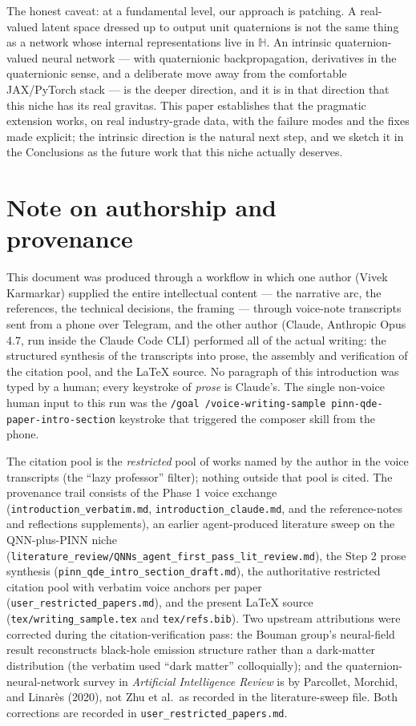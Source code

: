 \documentclass[11pt]{article}
\begin{document}
The honest caveat: at a fundamental level, our approach is patching. A real-valued latent space dressed up to output unit quaternions is not the same thing as a network whose internal representations live in $\mathbb{H}$. An intrinsic quaternion-valued neural network --- with quaternionic backpropagation, derivatives in the quaternionic sense, and a deliberate move away from the comfortable JAX/PyTorch stack --- is the deeper direction, and it is in that direction that this niche has its real gravitas. This paper establishes that the pragmatic extension works, on real industry-grade data, with the failure modes and the fixes made explicit; the intrinsic direction is the natural next step, and we sketch it in the Conclusions as the future work that this niche actually deserves.

\section*{Note on authorship and provenance}

This document was produced through a workflow in which one author (Vivek Karmarkar) supplied the entire intellectual content --- the narrative arc, the references, the technical decisions, the framing --- through voice-note transcripts sent from a phone over Telegram, and the other author (Claude, Anthropic Opus 4.7, run inside the Claude Code CLI) performed all of the actual writing: the structured synthesis of the transcripts into prose, the assembly and verification of the citation pool, and the LaTeX source. No paragraph of this introduction was typed by a human; every keystroke of \emph{prose} is Claude's. The single non-voice human input to this run was the \texttt{/goal /voice-writing-sample pinn-qde-paper-intro-section} keystroke that triggered the composer skill from the phone.

The citation pool is the \emph{restricted} pool of works named by the author in the voice transcripts (the ``lazy professor'' filter); nothing outside that pool is cited. The provenance trail consists of the Phase 1 voice exchange (\texttt{introduction\_verbatim.md}, \texttt{introduction\_claude.md}, and the reference-notes and reflections supplements), an earlier agent-produced literature sweep on the QNN-plus-PINN niche (\texttt{literature\_review/QNNs\_agent\_first\_pass\_lit\_review.md}), the Step 2 prose synthesis (\texttt{pinn\_qde\_intro\_section\_draft.md}), the authoritative restricted citation pool with verbatim voice anchors per paper (\texttt{user\_restricted\_papers.md}), and the present LaTeX source (\texttt{tex/writing\_sample.tex} and \texttt{tex/refs.bib}). Two upstream attributions were corrected during the citation-verification pass: the Bouman group's neural-field result reconstructs black-hole emission structure rather than a dark-matter distribution (the verbatim used ``dark matter'' colloquially); and the quaternion-neural-network survey in \emph{Artificial Intelligence Review} is by Parcollet, Morchid, and Linar{\`e}s (2020), not Zhu et al.\ as recorded in the literature-sweep file. Both corrections are recorded in \texttt{user\_restricted\_papers.md}.



\end{document}
